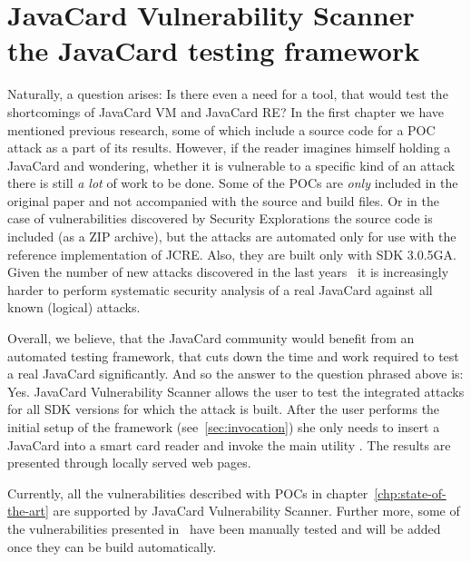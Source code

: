 \chapter{JavaCard Vulnerability Scanner the JavaCard testing framework}
Naturally, a question arises: Is there even a need for a tool, that would test the shortcomings of JavaCard VM and JavaCard RE?  In the first chapter we have mentioned previous research, some of which include a source code for a POC attack as a part of its results. However, if the reader imagines himself holding a JavaCard and wondering, whether it is vulnerable to a specific kind of an attack there is still \textit{a lot} of work to be done. Some of the POCs are \textit{only} included in the original paper and not accompanied with the source and build files. Or in the case of vulnerabilities discovered by Security Explorations the source code is included (as a ZIP archive), but the attacks are automated only for use with the reference implementation of JCRE. Also, they are built only with SDK 3.0.5GA. Given the number of new attacks discovered in the last years~\cite{se:oracle:part1, se:oracle:part2, se:oracle:part3, se:gemalto:part1, se:gemalto:part2} it is increasingly harder to perform systematic security analysis of a real JavaCard against all known (logical) attacks.


Overall, we believe, that the JavaCard community would benefit from an automated testing framework, that cuts down the time and work required to test a real JavaCard significantly. And so the answer to the question phrased above is: Yes. JavaCard Vulnerability Scanner allows the user to test the integrated attacks  for all SDK versions for which the attack is built. After the user performs the initial setup of the framework (see~\ref{sec:invocation}) she only needs to insert a JavaCard into a smart card reader and invoke the main utility \javus. The results are presented through locally served web pages.

Currently, all the vulnerabilities described with POCs in chapter~\ref{chp:state-of-the-art} are supported by JavaCard Vulnerability Scanner. Further more, some of the vulnerabilities presented in~\cite{sergei} have been manually tested and will be added once they can be build automatically.





